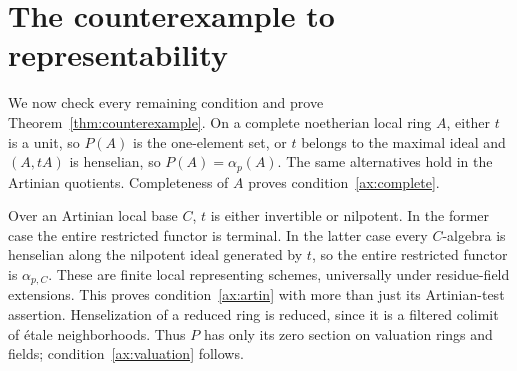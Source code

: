 \documentclass[11pt]{article}
\theoremstyle{definition}\newtheorem{definition}[theorem]{Definition}
\theoremstyle{remark}\newtheorem{remark}[theorem]{Remark}
\begin{document}
\section{The counterexample to representability}

We now check every remaining condition and prove Theorem~\ref{thm:counterexample}. On a complete noetherian local ring $A$, either $t$ is a unit, so $P(A)$ is the one-element set, or $t$ belongs to the maximal ideal and $(A,tA)$ is henselian, so $P(A)=\alpha_p(A)$. The same alternatives hold in the Artinian quotients. Completeness of $A$ proves condition~\ref{ax:complete}.

Over an Artinian local base $C$, $t$ is either invertible or nilpotent. In the former case the entire restricted functor is terminal. In the latter case every $C$-algebra is henselian along the nilpotent ideal generated by $t$, so the entire restricted functor is $\alpha_{p,C}$. These are finite local representing schemes, universally under residue-field extensions. This proves condition~\ref{ax:artin} with more than just its Artinian-test assertion. Henselization of a reduced ring is reduced, since it is a filtered colimit of \'etale neighborhoods. Thus $P$ has only its zero section on valuation rings and fields; condition~\ref{ax:valuation} follows.
\end{document}
